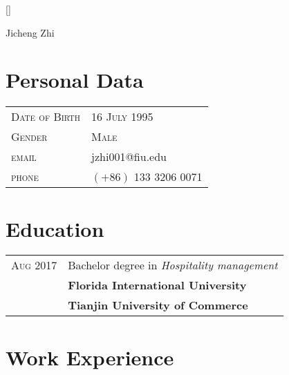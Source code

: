 \documentclass[11pt,a4paper]{article}
\begin{document}
 

\pagestyle{empty}
\setlength{\textwidth}{500pt}

\titleformat{\section}{\large\scshape\raggedright}{}{0em}{}[\titlerule]
\titlespacing{\section}{0pt}{3pt}{3pt}

\par{\centering
		{\Huge Jicheng \Huge{Zhi}
	}\bigskip
	\par}
	
\section{Personal Data}

\noindent\begin{tabular}{p{7cm} l}
	\textsc{Date of Birth} & \textsc{16 July 1995} \\
	\textsc{Gender} & \textsc{Male}\\
    \textsc{email} & jzhi001@fiu.edu\\
    \textsc{phone} & $\left(+86\right)$ 133 3206 0071
    
\end{tabular}

\section{Education}

\noindent\begin{tabular}{p{5cm} l}
	\textsc{Aug 2017} 
		& Bachelor degree in \emph{Hospitality management}\\
		&\textbf{Florida International University}\\
		&\textbf{Tianjin University of Commerce}\\
\end{tabular}

\section{Work Experience}
\end{document}
